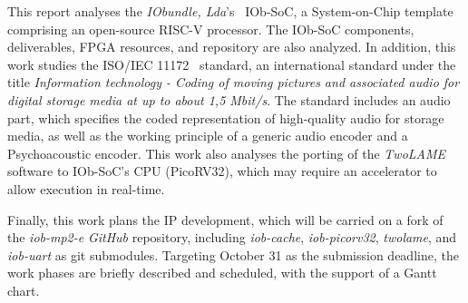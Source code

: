This report analyses the \textit{IObundle, Lda}'s~\cite{iobundle} IOb-SoC, a
System-on-Chip template comprising an open-source RISC-V processor. The IOb-SoC
components, deliverables, FPGA resources, and repository are also analyzed.  In
addition, this work studies the ISO/IEC 11172~\cite{11172} standard, an international
standard under the title \textit{Information technology - Coding of moving
pictures and associated audio for digital storage media at up to about 1,5
Mbit/s}. The standard includes an audio part, which specifies the coded
representation of high-quality audio for storage media, as well as the working
principle of a generic audio encoder and a Psychoacoustic encoder. This work
also analyses the porting of the \textit{TwoLAME} software to IOb-SoC's CPU
(PicoRV32), which may require an accelerator to allow execution in real-time.

Finally, this work plans the IP development, which will be carried on a fork of
the \textit{iob-mp2-e} \textit{GitHub} repository,
including \textit{iob-cache}, \textit{iob-picorv32}, \textit{twolame},
and \textit{iob-uart} as git submodules. Targeting October 31 as the submission
deadline, the work phases are briefly described and scheduled, with the support
of a Gantt chart.

